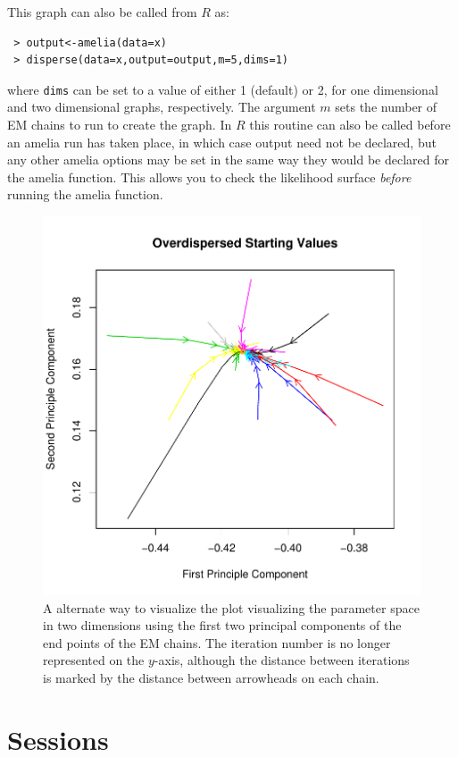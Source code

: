 \documentclass[12pt,titlepage]{article}
\begin{document}
This graph can also be called from $R$ as:
\begin{verbatim}
 > output<-amelia(data=x) 
 > disperse(data=x,output=output,m=5,dims=1)
\end{verbatim}
where \texttt{dims} can be set to a value of either 1 (default) or 2,
for one dimensional and two dimensional graphs, respectively.  The
argument $m$ sets the number of EM chains to run to create the graph.
In $R$ this routine can also be called before an amelia run has taken
place, in which case output need not be declared, but any other amelia
options may be set in the same way they would be declared for the
amelia function.  This allows you to check the likelihood surface
\emph{before} running the amelia function.
\begin{figure}
  \centering \includegraphics[scale=.7]{overdis2d}
  \caption{ A alternate way to visualize the plot visualizing the
    parameter space in two dimensions using the first two principal
    components of the end points of the EM chains.  The iteration
    number is no longer represented on the $y$-axis, although the
    distance between iterations is marked by the distance between
    arrowheads on each chain.}

\end{figure}

\section{Sessions}
\label{sec:sessions}
\end{document}
